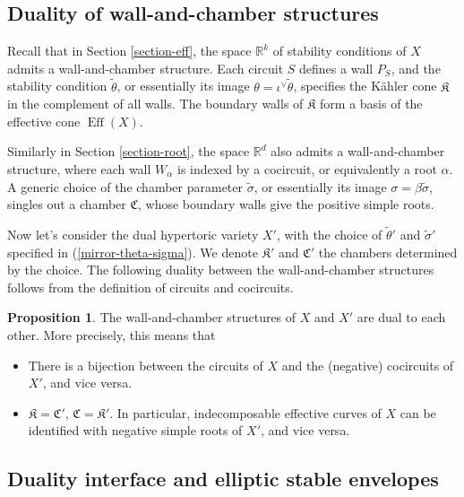 \documentclass[10pt]{amsart}
\theoremstyle{definition}
\def\RR{{\mathbb{R}}}
\newcommand{\Eff}{\operatorname{Eff}}
\newcommand{\fK}{\mathfrak{K}}
\theoremstyle{definition}
\numberwithin{equation}{section}
\theoremstyle{Theorem}
\newtheorem{Proposition}[Definition]{Proposition}
\newcommand{\fC}{\mathfrak{C}} %
\begin{document}
\subsection{Duality of wall-and-chamber structures}

Recall that in Section \ref{section-eff}, the space $\RR^k$ of stability conditions of $X$ admits a wall-and-chamber structure. Each circuit $S$ defines a wall $P_S$, and the stability condition $\widetilde\theta$, or essentially its image $\theta = \iota^\vee \widetilde\theta$, specifies the K\"ahler cone $\fK$ in the complement of all walls. The boundary walls of $\fK$ form a basis of the effective cone $\Eff (X)$.

Similarly in Section \ref{section-root}, the space $\RR^d$ also admits a wall-and-chamber structure, where each wall $W_\alpha$ is indexed by a cocircuit, or equivalently a root $\alpha$. A generic choice of the chamber parameter $\widetilde\sigma$, or essentially its image $\sigma = \beta \widetilde\sigma$, singles out a chamber $\fC$, whose boundary walls give the positive simple roots.

Now let's consider the dual hypertoric variety $X'$, with the choice of $\widetilde\theta'$ and $\widetilde\sigma'$ specified in (\ref{mirror-theta-sigma}). We denote $\fK'$ and $\fC'$ the chambers determined by the choice. The following duality between the wall-and-chamber structures follows from the definition of circuits and cocircuits.

\begin{Proposition}
	
	The wall-and-chamber structures of $X$ and $X'$ are dual to each other. More precisely, this means that
	
	\begin{itemize}
		
		\item There is a bijection between the circuits of $X$ and the (negative) cocircuits of $X'$, and vice versa.
		
		\item $\fK = \fC'$, $\fC = \fK'$. In particular, indecomposable effective curves of $X$ can be identified with negative simple roots of $X'$, and vice versa.
		
	\end{itemize}
	
\end{Proposition}




\subsection{Duality interface and elliptic stable envelopes}
\end{document}

